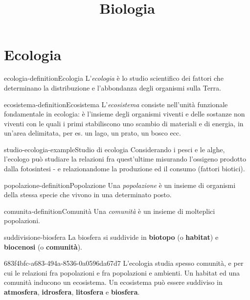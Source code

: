 \documentclass[preview]{standalone}
\begin{document}
\title{Biologia}
\genpage

\section{Ecologia}

\begin{snippetdefinition}{ecologia-definition}{Ecologia}
    L'\textit{ecologia} è lo studio scientifico dei fattori che determinano la
    distribuzione e l'abbondanza degli organismi sulla Terra.
\end{snippetdefinition}

\begin{snippetdefinition}{ecosistema-definition}{Ecosistema}
    L'\textit{ecosistema} consiste nell'unità funzionale fondamentale in ecologia: è
    l'insieme degli organismi viventi e delle sostanze non viventi
    con le quali i primi stabiliscono uno scambio di materiali e di
    energia, in un'area delimitata, per es. un lago, un prato, un
    bosco ecc.
\end{snippetdefinition}


\begin{snippetexample}{studio-ecologia-example}{Studio di ecologia}
    Considerando i pesci e le alghe, l'ecologo può studiare la relazioni fra
    quest'ultime misurando l'ossigeno prodotto dalla fotosintesi - e relazionandome
    la produzione ed il consumo (fattori biotici).
\end{snippetexample}

\begin{snippetdefinition}{popolazione-definition}{Popolazione}
    Una \textit{popolazione} è un insieme di organismi della stessa
    specie che vivono in una determinato posto.
\end{snippetdefinition}

\begin{snippetdefinition}{comunita-definition}{Comunità}
    Una \textit{comunità} è un insieme di molteplici popolazioni.
\end{snippetdefinition}


\begin{snippet}{suddivisione-biosfera}
    La biosfera si suddivide in \textbf{biotopo} (o \textbf{habitat}) e \textbf{biocenosi} (o \textbf{comunità}).
\end{snippet}

\begin{snippet}{683f4bfc-a683-494a-8536-0a0596da67d7}
    L'ecologia studia spesso comunità, e per cui le relazioni fra popolazioni e fra popolazioni
    e ambienti. Un habitat ed una comunità inducono un ecosistema.
    Un ecosistema può essere suddiviso in \textbf{atmosfera}, \textbf{idrosfera}, \textbf{litosfera}
    e \textbf{biosfera}.
\end{snippet}
\end{document}
